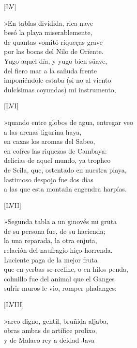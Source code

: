 \documentclass[11pt,a4paper,twoside]{article}
\begin{document}
\begin{center}
	[LV]
\end{center}\pstart
»En tablas dividida, rica nave\\
besó la playa miserablemente,\\
de quantas vomitó riqueças grave\\
por las bocas del Nilo de Orïente.\\
Yugo aquel día, y yugo bien süave,\\
del fiero mar a la sañuda frente\\
imponiéndole estaba (si no al viento\\
dulcísimas coyundas) mi instrumento,\par\pend
%
\begin{center}
	[LVI]
\end{center}\pstart
»quando entre globos de agua, entregar veo\\
a las arenas ligurina haya,\\
en caxas los aromas del Sabeo,\\
en cofres las riquezas de Cambaya:\\
delicias de aquel mundo, ya tropheo\\
de Scila, que, ostentado en nuestra playa,\\
lastimoso despojo fue dos días\\
a las que esta montaña engendra harpías.\par\pend
%
\begin{center}
	[LVII]
\end{center}\pstart
»Segunda tabla a un ginovés mi gruta\\
de su persona fue, de su hacienda;\\
la una reparada, la otra enjuta,\\
relación del naufragio hiço horrenda.\\
Luciente paga de la mejor fruta\\
que en yerbas se recline, o en hilos penda,\\
colmillo fue del animal que el Ganges\\
sufrir muros le vio, romper phalanges:\par\pend
%
\begin{center}
	[LVIII]
\end{center}\pstart
»arco digno, gentil, bruñida aljaba,\\
obras ambas de artífice prolixo,\\
y de Malaco rey a deidad Java\\
\end{document}
